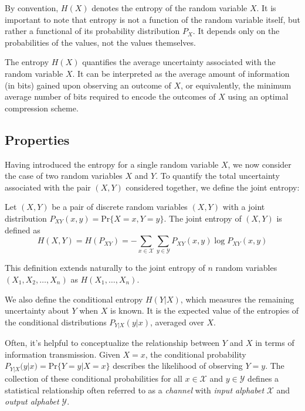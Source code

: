 \begin{remark}
    By convention, $H(X)$ denotes the entropy of the random variable $X$. It is important to note that entropy is not a function of the random variable itself, but rather a functional of its probability distribution $P_X$. It depends only on the probabilities of the values, not the values themselves.
\end{remark}

The entropy $H(X)$ quantifies the average uncertainty associated with the random variable $X$. It can be interpreted as the average amount of information (in bits) gained upon observing an outcome of $X$, or equivalently, the minimum average number of bits required to encode the outcomes of $X$ using an optimal compression scheme.

\subsection{Properties}
Having introduced the entropy for a single random variable $X$, we now consider the case of two random variables $X$ and $Y$. To quantify the total uncertainty associated with the pair $(X,Y)$ considered together, we define the joint entropy:

\begin{definition}\label{def:joint_entropy}
    Let $(X,Y)$ be a pair of discrete random variables $(X,Y)$ with a joint distribution $P_{XY}(x,y) = \text{Pr}\{X=x,Y=y\}$. The joint entropy of $(X,Y)$ is defined as
    \begin{equation*}\label{eq:joint_entropy}
        H(X,Y) = H(P_{XY}) = -\sum_{x\in\mathcal{X}}\sum_{y\in\mathcal{Y}} P_{XY}(x,y)\log P_{XY}(x,y)
    \end{equation*}
\end{definition}
This definition extends naturally to the joint entropy of $n$ random variables $(X_1,X_2,\ldots,X_n)$ as $H(X_1,\ldots, X_n)$.

We also define the conditional entropy $H(Y|X)$, which measures the remaining uncertainty about $Y$ when $X$ is known. It is the expected value of the entropies of the conditional distributions $P_{Y|X}(y|x)$, averaged over $X$.

Often, it's helpful to conceptualize the relationship between $Y$ and $X$ in terms of information transmission. Given $X=x$, the conditional probability $P_{Y|X}(y|x) = \text{Pr}\{Y=y|X=x\}$ describes the likelihood of observing $Y=y$. The collection of these conditional probabilities for all $x \in \mathcal{X}$ and $y \in \mathcal{Y}$ defines a statistical relationship often referred to as a \emph{channel} with \emph{input alphabet} $\mathcal{X}$ and \emph{output alphabet} $\mathcal{Y}$.

